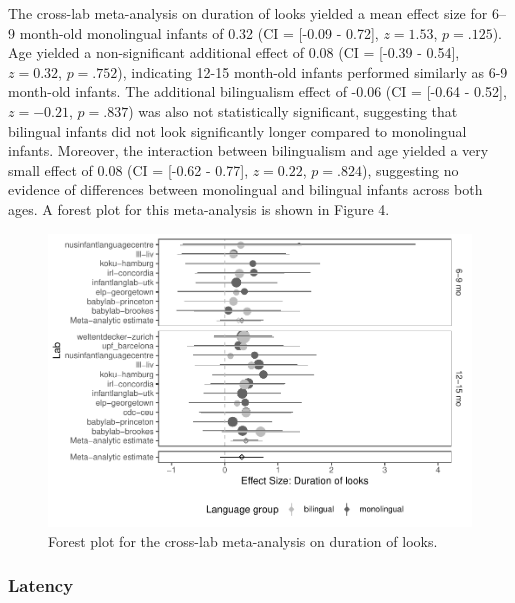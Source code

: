 \documentclass[,man,floatsintext]{apa6}
\begin{document}
The cross-lab meta-analysis on duration of looks yielded a mean effect size for 6--9 month-old monolingual infants of 0.32 (CI = {[}-0.09 - 0.72{]}, \(z = 1.53\), \(p = .125\)). Age yielded a non-significant additional effect of 0.08 (CI = {[}-0.39 - 0.54{]}, \(z = 0.32\), \(p = .752\)), indicating 12-15 month-old infants performed similarly as 6-9 month-old infants. The additional bilingualism effect of -0.06 (CI = {[}-0.64 - 0.52{]}, \(z = -0.21\), \(p = .837\)) was also not statistically significant, suggesting that bilingual infants did not look significantly longer compared to monolingual infants. Moreover, the interaction between bilingualism and age yielded a very small effect of 0.08 (CI = {[}-0.62 - 0.77{]}, \(z = 0.22\), \(p = .824\)), suggesting no evidence of differences between monolingual and bilingual infants across both ages. A forest plot for this meta-analysis is shown in Figure 4.

\begin{figure}
\centering
\includegraphics{gaze-following-paper_files/figure-latex/fig4-1.pdf}
\caption{\label{fig:fig4}Forest plot for the cross-lab meta-analysis on duration of looks.}
\end{figure}

\hypertarget{latency}{%
\subsubsection{Latency}\label{latency}}
\end{document}
